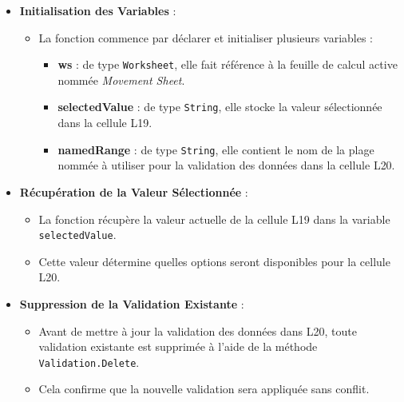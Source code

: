 \documentclass[a4paper, oneside, 12pt, final]{extreport}
\begin{document}
\begin{itemize}
    \item \textbf{Initialisation des Variables} :
    \begin{itemize}
        \item La fonction commence par déclarer et initialiser plusieurs variables :
        \begin{itemize}
            \item \textbf{ws} : de type \texttt{Worksheet}, elle fait référence à la feuille de calcul active nommée \textit{Movement Sheet}.
            \item \textbf{selectedValue} : de type \texttt{String}, elle stocke la valeur sélectionnée dans la cellule L19.
            \item \textbf{namedRange} : de type \texttt{String}, elle contient le nom de la plage nommée à utiliser pour la validation des données dans la cellule L20.
        \end{itemize}
    \end{itemize}

    \item \textbf{Récupération de la Valeur Sélectionnée} :
    \begin{itemize}
        \item La fonction récupère la valeur actuelle de la cellule L19 dans la variable \texttt{selectedValue}.
        \item Cette valeur détermine quelles options seront disponibles pour la cellule L20.
    \end{itemize}

    \item \textbf{Suppression de la Validation Existante} :
    \begin{itemize}
        \item Avant de mettre à jour la validation des données dans L20, toute validation existante est supprimée à l'aide de la méthode \texttt{Validation.Delete}.
        \item Cela confirme que la nouvelle validation sera appliquée sans conflit.
    \end{itemize}


\end{itemize}
\end{document}
